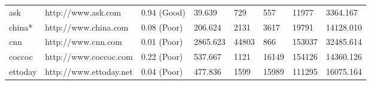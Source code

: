 \begin{table}[]
{\begin{tabular}{|l|l|l|l|l|l|l|l|}
\rowcolor[HTML]{EFEFEF} 
ask               & http://www.ask.com         & 0.94 (Good)                                                                                & 39.639                                                                            & 729                                                            & 557                                                           & 11977                                                                & 3364.167                                                                       \\
china*            & http://www.china.com       & 0.08 (Poor)                                                                                & 206.624                                                                           & 2131                                                           & 3617                                                          & 19791                                                                & 14128.010                                                                      \\
\rowcolor[HTML]{EFEFEF} 
cnn               & http://www.cnn.com         & 0.01 (Poor)                                                                                & 2865.623                                                                          & 44803                                                          & 866                                                           & 153037                                                               & 32485.614                                                                      \\
coccoc            & http://www.coccoc.com      & 0.22 (Poor)                                                                                & 537.667                                                                           & 1121                                                           & 16149                                                         & 154126                                                               & 14360.126                                                                      \\
\rowcolor[HTML]{EFEFEF} 
ettoday           & http://www.ettoday.net     & 0.04 (Poor)                                                                                & 477.836                                                                           & 1599                                                           & 15989                                                         & 111295                                                               & 16075.164                                                                      \\

\end{tabular}}
\end{table}
